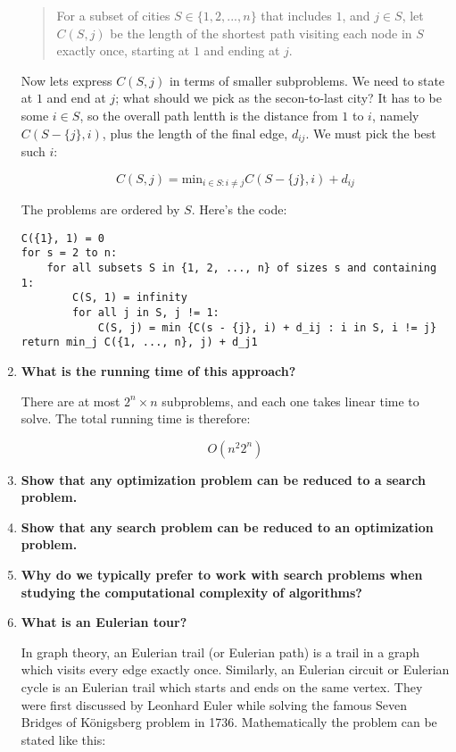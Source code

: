 \documentclass[a4paper,11pt]{article}
\begin{document}
\begin{enumerate}
  \begin{quote}
  For a subset of cities $S \in \lbrace 1,2,...,n \rbrace$ that includes
  $1$, and $j \in S$, let $C(S,j)$ be the length of the shortest path
  visiting each node in $S$ exactly once, starting at $1$ and ending at
  $j$.
  \end{quote}

  Now lets express $C(S, j)$ in terms of smaller subproblems. We need to
  state at $1$ and end at $j$; what should we pick as the secon-to-last
  city? It has to be some $i \in S$, so the overall path lentth is the
  distance from $1$ to $i$, namely $C(S - \lbrace j \rbrace, i)$, plus
  the length of the final edge, $d_{ij}$. We must pick the best such
  $i$:

  \[C(S, j) = \text{min}_{i \in S : i \not = j} C(S - \lbrace j \rbrace, i) + d_{ij}\]

  The problems are ordered by $S$. Here's the code:

\begin{verbatim}
C({1}, 1) = 0
for s = 2 to n:
    for all subsets S in {1, 2, ..., n} of sizes s and containing 1:
        C(S, 1) = infinity
        for all j in S, j != 1:
            C(S, j) = min {C(s - {j}, i) + d_ij : i in S, i != j}
return min_j C({1, ..., n}, j) + d_j1
\end{verbatim}
\item
  \textbf{What is the running time of this approach?}

  There are at most $2^n \times n$ subproblems, and each one takes
  linear time to solve. The total running time is therefore:

  \[O(n^2 2^n)\]
\item
  \textbf{Show that any optimization problem can be reduced to a search
  problem.}
\item
  \textbf{Show that any search problem can be reduced to an optimization
  problem.}
\item
  \textbf{Why do we typically prefer to work with search problems when
  studying the computational complexity of algorithms?}
\item
  \textbf{What is an Eulerian tour?}

  In graph theory, an Eulerian trail (or Eulerian path) is a trail in a
  graph which visits every edge exactly once. Similarly, an Eulerian
  circuit or Eulerian cycle is an Eulerian trail which starts and ends
  on the same vertex. They were first discussed by Leonhard Euler while
  solving the famous Seven Bridges of Königsberg problem in 1736.
  Mathematically the problem can be stated like this:


\end{enumerate}
\end{document}
